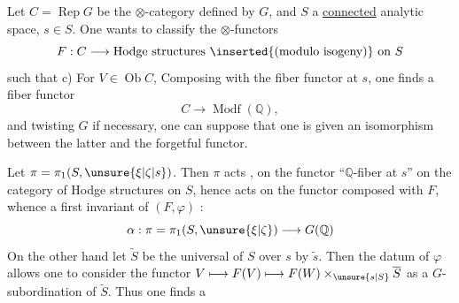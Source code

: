 Let $C=\operatorname{Rep}G$ be the $\otimes$-category defined by $G$, and $S$ a \uline{connected} analytic space, $s\in S$. One wants to classify the $\otimes$-functors
\[
F:C\longrightarrow\text{Hodge structures \inserted{(modulo isogeny)} on }S
\]
such that c) For   $V\in\operatorname{Ob}C$,  
Composing with the fiber functor at $s$, one finds a fiber functor
\[
C\longrightarrow\operatorname{Modf}(\mathbb{Q}),
\]
and twisting $G$ if necessary, one can suppose that one is given an isomorphism \inserted{$\varphi$} between the latter and the forgetful functor.

 Let $\pi=\pi_1(S,\unsure{\xi|\zeta|s})$. Then $\pi$ acts , on the functor  ``$\mathbb{Q}$-fiber at $s$'' on the category of Hodge structures on $S$, hence acts on the functor composed with $F$, whence a first invariant of $(F,\varphi)$ :
\[
\alpha:\pi=\pi_1(S,\unsure{\xi|\zeta})\longrightarrow G(\mathbb{Q})
\]
On the other hand let $\widetilde{S}$ be the universal  of $S$   over $s$ by $\widetilde{s}$. Then the datum of $\varphi$ allows one to consider the functor $V\longmapsto F(V)\longmapsto F(W)\times_{\unsure{s|S}}\overline{S}$ as a $G$-subordination of $\widetilde{S}$. Thus one finds a
